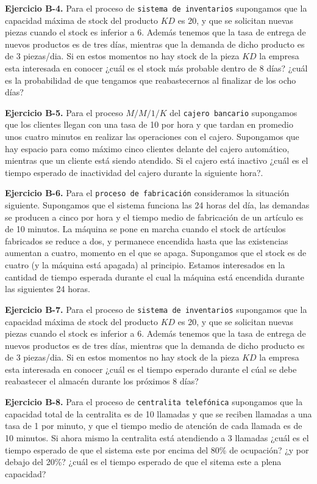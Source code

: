 \documentclass[
]{book}
\theoremstyle{definition}
\theoremstyle{definition}
\theoremstyle{definition}
\theoremstyle{definition}
\theoremstyle{remark}
\begin{document}
\textbf{Ejercicio B-4.} Para el proceso de \texttt{sistema\ de\ inventarios} supongamos que la capacidad máxima de stock del producto \(KD\) es 20, y que se solicitan nuevas piezas cuando el stock es inferior a 6. Además tenemos que la tasa de entrega de nuevos productos es de tres días, mientras que la demanda de dicho producto es de 3 piezas/dia. Si en estos momentos no hay stock de la pieza \(KD\) la empresa esta interesada en conocer ¿cuál es el stock más probable dentro de 8 días? ¿cuál es la probabilidad de que tengamos que reabastecernos al finalizar de los ocho días?

\textbf{Ejercicio B-5.} Para el proceso \(M/M/1/K\) del \texttt{cajero\ bancario} supongamos que los clientes llegan con una tasa de 10 por hora y que tardan en promedio unos cuatro minutos en realizar las operaciones con el cajero. Supongamos que hay espacio para como máximo cinco clientes delante del cajero automático, mientras que un cliente está siendo atendido. Si el cajero está inactivo ¿cuál es el tiempo esperado de inactividad del cajero durante la siguiente hora?.

\textbf{Ejercicio B-6.} Para el \texttt{proceso\ de\ fabricación} consideramos la situación siguiente. Supongamos que el sistema funciona las 24 horas del día, las demandas se producen a cinco por hora y el tiempo medio de fabricación de un artículo es de 10 minutos. La máquina se pone en marcha cuando el stock de artículos fabricados se reduce a dos, y permanece encendida hasta que las existencias aumentan a cuatro, momento en el que se apaga. Supongamos que el stock es de cuatro (y la máquina está apagada) al principio. Estamos interesados en la cantidad de tiempo esperada durante el cual la máquina está encendida durante las siguientes 24 horas.

\textbf{Ejercicio B-7.} Para el proceso de \texttt{sistema\ de\ inventarios} supongamos que la capacidad máxima de stock del producto \(KD\) es 20, y que se solicitan nuevas piezas cuando el stock es inferior a 6. Además tenemos que la tasa de entrega de nuevos productos es de tres días, mientras que la demanda de dicho producto es de 3 piezas/dia. Si en estos momentos no hay stock de la pieza \(KD\) la empresa esta interesada en conocer ¿cuál es el tiempo esperado durante el cúal se debe reabastecer el almacén durante los próximos 8 días?

\textbf{Ejercicio B-8.} Para el proceso de \texttt{centralita\ telefónica} supongamos que la capacidad total de la centralita es de 10 llamadas y que se reciben llamadas a una tasa de 1 por minuto, y que el tiempo medio de atención de cada llamada es de 10 minutos. Si ahora mismo la centralita está atendiendo a 3 llamadas ¿cuál es el tiempo esperado de que el sistema este por encima del 80\% de ocupación? ¿y por debajo del 20\%? ¿cuál es el tiempo esperado de que el sitema este a plena capacidad?
\end{document}
